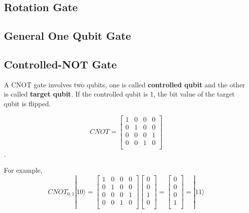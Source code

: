\subsection{Rotation Gate}
\subsection{General One Qubit Gate}

\subsection{Controlled-NOT Gate}
A CNOT gate involves two qubits, one is called \textbf{controlled qubit} and the other is called \textbf{target qubit}.  If the controlled qubit is 1, the bit value of the target qubit is flipped.

\begin{equation}
CNOT = \begin{bmatrix}
1 & 0 & 0 & 0 \\
0 & 1 & 0 & 0 \\
0 & 0 & 0 & 1 \\
0 & 0 & 1 & 0 \\
\end{bmatrix}
\end{equation}.

For example,
\begin{equation}
CNOT_{0,1}|10\rangle = 
\begin{bmatrix}
1 & 0 & 0 & 0 \\
0 & 1 & 0 & 0 \\
0 & 0 & 0 & 1 \\
0 & 0 & 1 & 0 \\
\end{bmatrix}
 \left[
\begin{array}{c}
0 \\
0 \\
1 \\
0 \\
\end{array}
\right]
=  \left[
\begin{array}{c}
0 \\
0 \\
0 \\
1 \\
\end{array}
\right] 
= |11\rangle 
\end{equation}

